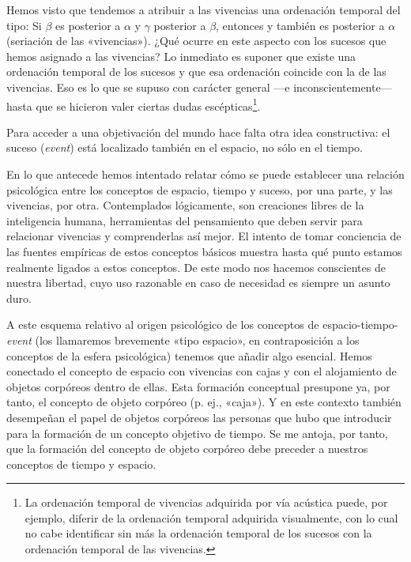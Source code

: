\documentclass[spanish]{book}
\begin{document}
Hemos visto que tendemos a atribuir a las vivencias una ordenación temporal del tipo:
Si $\beta$ es posterior a $\alpha$ y $\gamma$ posterior a $\beta$, entonces y también
es posterior a $\alpha$ (seriación de las «vivencias»). ¿Qué ocurre en este aspecto con los
sucesos que hemos asignado a las vivencias? Lo inmediato es suponer que existe una 
ordenación temporal de los sucesos y que esa ordenación coincide con la de las vivencias.
Eso es lo que se supuso con carácter general —e inconscientemente— hasta que se hicieron valer
ciertas dudas escépticas\footnote{La ordenación temporal de vivencias adquirida por
vía acústica puede, por ejemplo, diferir de la
ordenación temporal adquirida visualmente, con lo cual no cabe identificar sin más la 
ordenación temporal de los sucesos con la ordenación temporal de las vivencias.}.

Para acceder a una objetivación del mundo hace falta otra idea constructiva: el suceso
(\textit{event}) está localizado también en el espacio, no sólo en el tiempo.

En lo que antecede hemos intentado relatar cómo se puede establecer una relación
psicológica entre los conceptos de espacio, tiempo y suceso, por una parte, y las
vivencias, por otra. Contemplados lógicamente, son creaciones libres de la
inteligencia humana, herramientas del pensamiento que deben servir para relacionar
vivencias y comprenderlas así mejor. El intento de tomar conciencia de las fuentes
empíricas de estos conceptos básicos muestra hasta qué punto estamos realmente
ligados a estos conceptos. De este modo nos hacemos conscientes de nuestra libertad,
cuyo uso razonable en caso de necesidad es siempre un asunto duro.

A este esquema relativo al origen psicológico de los conceptos de espacio-tiempo-\textit{event}
(los llamaremos brevemente «tipo espacio», en contraposición a los conceptos de la
esfera psicológica) tenemos que añadir algo esencial. Hemos conectado el concepto de
espacio con vivencias con cajas y con el alojamiento de objetos corpóreos dentro de
ellas. Esta formación conceptual presupone ya, por tanto, el concepto de objeto
corpóreo (p. ej., «caja»). Y en este contexto también desempeñan el papel de objetos
corpóreos las personas que hubo que introducir para la formación de un concepto
objetivo de tiempo. Se me antoja, por tanto, que la formación del concepto de objeto
corpóreo debe preceder a nuestros conceptos de tiempo y espacio.
\end{document}
